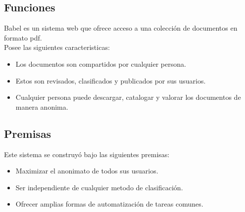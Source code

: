 \documentclass[11pt]{beamer}
\begin{document}
\subsection{Funciones}
\begin{frame}
Babel es un sistema web que ofrece acceso a una colección de documentos en formato pdf.\\ \pause
Posee las siguientes caracteristicas: \pause
\begin{itemize}
\item Los documentos son compartidos por cualquier persona. \pause
\item Estos son revisados, clasificados y publicados por sus usuarios. \pause
\item Cualquier persona puede descargar, catalogar y valorar los documentos de manera anonima.
\end{itemize}
\end{frame}

\subsection{Premisas}
\begin{frame}
Este sistema se construyó bajo las siguientes premisas:\\ \pause
\begin{itemize}
\item Maximizar el anonimato de todos sus usuarios. \pause
\item Ser independiente de cualquier metodo de clasificación. \pause
\item Ofrecer amplias formas de automatización de tareas comunes.
\end{itemize}
\end{frame}
\end{document}
